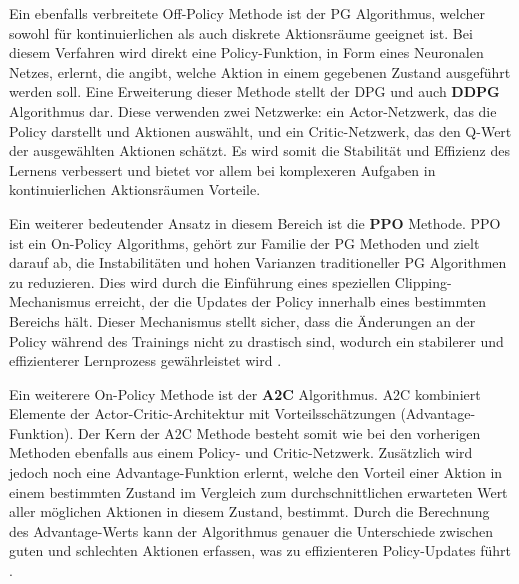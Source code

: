 \documentclass[twocolumn]{webofc}
\begin{document}
Ein ebenfalls verbreitete Off-Policy Methode ist der \ac{PG} Algorithmus, welcher sowohl für kontinuierlichen als auch diskrete Aktionsräume geeignet ist. Bei diesem Verfahren wird direkt eine Policy-Funktion, in Form eines Neuronalen Netzes, erlernt, die angibt, welche Aktion in einem gegebenen Zustand ausgeführt werden soll.
Eine Erweiterung dieser Methode stellt der \ac{DPG} und auch \textbf{\ac{DDPG}} Algorithmus dar. Diese verwenden zwei Netzwerke: ein Actor-Netzwerk, das die Policy darstellt und Aktionen auswählt, und ein Critic-Netzwerk, das den Q-Wert der ausgewählten Aktionen schätzt. Es wird somit die Stabilität und Effizienz des Lernens verbessert und bietet vor allem bei komplexeren Aufgaben in kontinuierlichen Aktionsräumen Vorteile. 

Ein weiterer bedeutender Ansatz in diesem Bereich ist die \textbf{\ac{PPO}} Methode. \ac{PPO} ist ein On-Policy Algorithms, gehört zur Familie der \ac{PG} Methoden und zielt darauf ab, die Instabilitäten und hohen Varianzen traditioneller \ac{PG} Algorithmen zu reduzieren. Dies wird durch die Einführung eines speziellen Clipping-Mechanismus erreicht, der die Updates der Policy innerhalb eines bestimmten Bereichs hält. Dieser Mechanismus stellt sicher, dass die Änderungen an der Policy während des Trainings nicht zu drastisch sind, wodurch ein stabilerer und effizienterer Lernprozess gewährleistet wird \cite{SchulmanWDRK17}.

Ein weiterere On-Policy Methode ist der \textbf{\ac{A2C}} Algorithmus.
\ac{A2C} kombiniert Elemente der Actor-Critic-Architektur mit Vorteilsschätzungen (Advantage-Funktion). Der Kern der \ac{A2C} Methode besteht somit wie bei den vorherigen Methoden ebenfalls aus einem Policy- und Critic-Netzwerk. Zusätzlich wird jedoch noch eine Advantage-Funktion erlernt, welche den Vorteil einer Aktion in einem bestimmten Zustand im Vergleich zum durchschnittlichen erwarteten Wert aller möglichen Aktionen in diesem Zustand, bestimmt. Durch die Berechnung des Advantage-Werts kann der Algorithmus genauer die Unterschiede zwischen guten und schlechten Aktionen erfassen, was zu effizienteren Policy-Updates führt \cite{MnihBMGLHSK16}.

\end{document}
